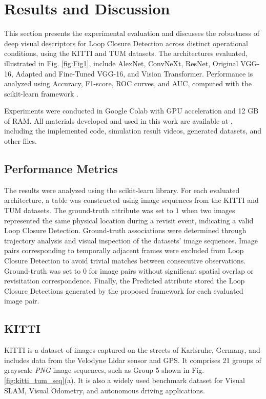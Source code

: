 \documentclass{ieeeaccess}
\begin{document}
\section{Results and Discussion} 
\label{sec:resul}

This section presents the experimental evaluation and discusses the robustness of deep visual descriptors for Loop Closure Detection across distinct operational conditions, using the KITTI and TUM datasets. The architectures evaluated, illustrated in Fig. \ref{fig:Fig1}, include AlexNet, ConvNeXt, ResNet, Original VGG-16, Adapted and Fine-Tuned VGG-16, and Vision Transformer. Performance is analyzed using Accuracy, F1-score, ROC curves, and AUC, computed with the scikit-learn framework \cite{Pedregosa2011ScikitLearn}.

Experiments were conducted in Google Colab with GPU acceleration and 12 GB of RAM. All materials developed and used in this work are available at \cite{IegawaBotelho2022LoopClosureGitHub}, including the implemented code, simulation result videos, generated datasets, and other files. 

\subsection{Performance Metrics}

The results were analyzed using the scikit-learn library. For each evaluated architecture, a table was constructed using image sequences from the KITTI and TUM datasets. The ground-truth attribute was set to $1$ when two images represented the same physical location during a revisit event, indicating a valid Loop Closure Detection. Ground-truth associations were determined through trajectory analysis and visual inspection of the datasets' image sequences. Image pairs corresponding to temporally adjacent frames were excluded from Loop Closure Detection to avoid trivial matches between consecutive observations. Ground-truth was set to $0$ for image pairs without significant spatial overlap or revisitation correspondence. Finally, the Predicted attribute stored the Loop Closure Detections generated by the proposed framework for each evaluated image pair.

\subsection{KITTI}

KITTI is a dataset of images captured on the streets of Karlsruhe, Germany, and includes data from the Velodyne Lidar sensor and GPS. It comprises 21 groups of grayscale \emph{PNG} image sequences, such as Group 5 shown in Fig. \ref{fig:kitti_tum_seq}(a). It is also a widely used benchmark dataset for Visual SLAM, Visual Odometry, and autonomous driving applications.
\end{document}
